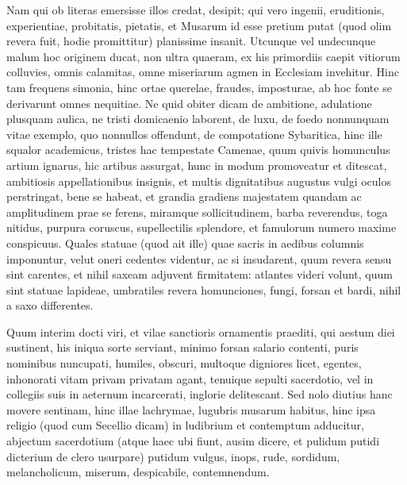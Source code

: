 {{{Nam qui ob
literas emersisse illos credat, desipit; qui vero ingenii, eruditionis,
experientiae, probitatis, pietatis, et Musarum id esse pretium putat
(quod olim revera fuit, hodie promittitur) planissime insanit. Utcunque
vel undecunque malum hoc originem ducat, non ultra quaeram, ex his
primordiis caepit vitiorum colluvies, omnis calamitas, omne miseriarum
agmen in Ecclesiam invehitur. Hinc tam frequens simonia, hinc ortae
querelae, fraudes, imposturae, ab hoc fonte se derivarunt omnes
nequitiae. Ne quid obiter dicam de ambitione, adulatione plusquam
aulica, ne tristi domicaenio laborent, de luxu, de foedo nonnunquam
vitae exemplo, quo nonnullos offendunt, de compotatione Sybaritica, \etc{}
hinc ille squalor academicus, tristes hac tempestate Camenae, quum
quivis homunculus artium ignarus, hic artibus assurgat, hunc in modum
promoveatur et ditescat, ambitiosis appellationibus insignis, et multis
dignitatibus augustus vulgi oculos perstringat, bene se habeat, et
grandia gradiens majestatem quandam ac amplitudinem prae se ferens,
miramque sollicitudinem, barba reverendus, toga nitidus, purpura
coruscus, supellectilis splendore, et famulorum numero maxime
conspicuus. Quales statuae (quod ait ille) quae sacris in aedibus
columnis imponuntur, velut oneri cedentes videntur, ac si insudarent,
quum revera sensu sint carentes, et nihil saxeam adjuvent firmitatem:
atlantes videri volunt, quum sint statuae lapideae, umbratiles revera
homunciones, fungi, forsan et bardi, nihil a saxo differentes.

Quum interim docti viri, et vilae sanctioris ornamentis praediti, qui aestum
diei sustinent, his iniqua sorte serviant, minimo forsan salario
contenti, puris nominibus nuncupati, humiles, obscuri, multoque
digniores licet, egentes, inhonorati vitam privam privatam agant,
tenuique sepulti sacerdotio, vel in collegiis suis in aeternum
incarcerati, inglorie delitescant. Sed nolo diutius hanc movere
sentinam, hinc illae lachrymae, lugubris musarum habitus, hinc
ipsa religio (quod cum Secellio dicam) in ludibrium et contemptum
adducitur, abjectum sacerdotium (atque haec ubi fiunt, ausim dicere, et
pulidum  putidi dicterium de clero usurpare) putidum vulgus,
inops, rude, sordidum, melancholicum, miserum, despicabile,
contemnendum.}

}}
